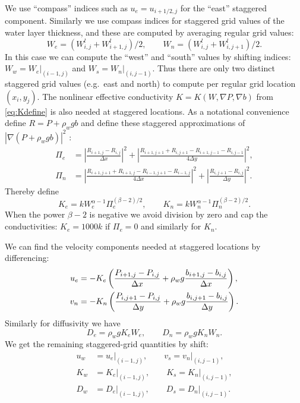 \documentclass[11pt,final]{amsart}
\newcommand{\grad}{\nabla}
\begin{document}
We use ``compass'' indices such as $u_e = u_{i+1/2,j}$ for the ``east'' staggered component.  Similarly we use compass indices for staggered grid values of the water layer thickness, and these are computed by averaging regular grid values:
\begin{equation}
W_e = (W_{i,j}^l + W_{i+1,j}^l)/2, \qquad W_n = (W_{i,j}^l + W_{i,j+1}^l)/2. \label{eq:stagW}
\end{equation}
In this case we can compute the ``west'' and ``south'' values by shifting indices: $W_w = W_e\big|_{(i-1,j)}$ and $W_s = W_n\big|_{(i,j-1)}$.  Thus there are only two distinct staggered grid values (e.g.~east and north) to compute per regular grid location $(x_i,y_j)$.
The nonlinear effective conductivity $K=K(W,\grad P,\grad b)$ from \eqref{eq:Kdefine} is also needed at staggered locations.  As a notational convenience define $R=P+\rho_w g b$ and define these staggered approximations of $|\grad(P+\rho_w g b)|^2$ \citep[compare][]{Mahaffy}:
\begin{align*}
\Pi_e &= \left|\frac{R_{i+1,j}-R_{i,j}}{\Delta x}\right|^2 + \left|\frac{R_{i+1,j+1}+R_{i,j+1} - R_{i+1,j-1}-R_{i,j-1}}{4\Delta y}\right|^2, \\
\Pi_n &= \left|\frac{R_{i+1,j+1}+R_{i+1,j} - R_{i-1,j+1}-R_{i-1,j}}{4\Delta x}\right|^2 + \left|\frac{R_{i,j+1}-R_{i,j}}{\Delta y}\right|^2.
\end{align*}
Thereby define
\begin{equation}
K_e = k W_e^{\alpha-1} \Pi_e^{(\beta-2)/2}, \qquad K_n = k W_n^{\alpha-1} \Pi_n^{(\beta-2)/2}.  \label{eq:stagK}
\end{equation}
When the power $\beta-2$ is negative we avoid division by zero and cap the conductivities: $K_e = 1000 k$ if $\Pi_e = 0$ and similarly for $K_n$.

We can find the velocity components needed at staggered locations by differencing:
\begin{align}
u_e &= - K_e \left(\frac{P_{i+1,j}-P_{i,j}}{\Delta x} + \rho_w g \frac{b_{i+1,j}-b_{i,j}}{\Delta x}\right),  \label{eq:velocitycomp} \\
v_n &= - K_n \left(\frac{P_{i,j+1}-P_{i,j}}{\Delta y} + \rho_w g \frac{b_{i,j+1}-b_{i,j}}{\Delta y}\right). \notag
\end{align}
Similarly for diffusivity we have
\begin{equation}
D_e = \rho_w g K_e W_e, \qquad D_n = \rho_w g K_n W_n.  \label{eq:diffusivitycomp}
\end{equation}
We get the remaining staggered-grid quantities by shift:
\begin{align*}
u_w &= u_e\big|_{(i-1,j)}, \qquad v_s = v_n\big|_{(i,j-1)}, \\
K_w &= K_e\big|_{(i-1,j)}, \qquad K_s = K_n\big|_{(i,j-1)}, \\
D_w &= D_e\big|_{(i-1,j)}, \qquad D_s = D_n\big|_{(i,j-1)}.
\end{align*}
\end{document}
